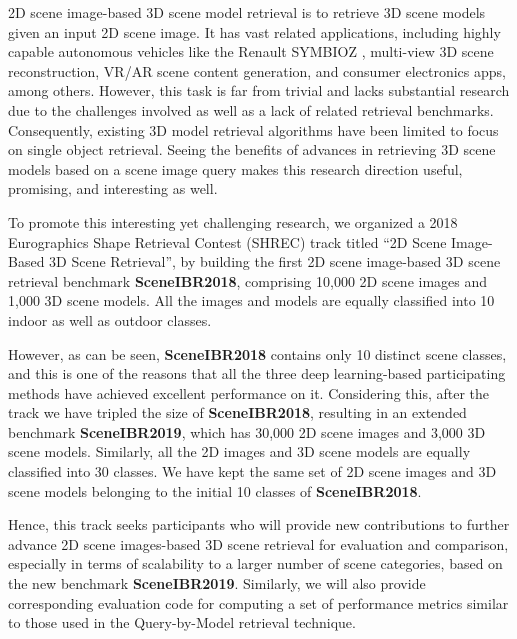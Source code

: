 \documentclass[../main.tex]{subfiles}
\begin{document}
2D scene image-based 3D scene model retrieval is to retrieve 3D scene models given an input 2D scene image. It has vast related applications, including highly capable autonomous vehicles like the Renault SYMBIOZ \cite{Renault} \cite{Youtube}, multi-view 3D scene reconstruction, VR/AR scene content generation, and consumer electronics apps, among others. However, this task is far from trivial and lacks substantial research due to the challenges involved as well as a lack of related retrieval benchmarks. Consequently, existing 3D model retrieval algorithms have been limited to focus on single object retrieval. Seeing the benefits of advances in retrieving 3D scene models based on a scene image query makes this research direction useful, promising, and interesting as well.

To promote this interesting yet challenging research, we organized a 2018 Eurographics Shape Retrieval Contest (SHREC) track \cite{SHREC18-SceneIBR-Track} titled “2D Scene Image-Based 3D Scene Retrieval”, by building the first 2D scene image-based 3D scene retrieval benchmark \textbf{SceneIBR2018}, comprising 10,000 2D scene images and 1,000 3D scene models. All the images and models are equally classified into 10 indoor as well as outdoor classes.

However, as can be seen, \textbf{SceneIBR2018} contains only 10 distinct scene classes, and this is one of the reasons that all the three deep learning-based participating methods have achieved excellent performance on it. Considering this, after the track we have tripled the size of \textbf{SceneIBR2018}, resulting in an extended benchmark \textbf{SceneIBR2019}, which has 30,000 2D scene images and 3,000 3D scene models. Similarly, all the 2D images and 3D scene models are equally classified into 30 classes. We have kept the same set of 2D scene images and 3D scene models belonging to the initial 10 classes of \textbf{SceneIBR2018}.

Hence, this track seeks participants who will provide new contributions to further advance 2D scene images-based 3D scene retrieval for evaluation and comparison, especially in terms of scalability to a larger number of scene categories, based on the new benchmark \textbf{SceneIBR2019}. Similarly, we will also provide corresponding evaluation code for computing a set of performance metrics similar to those used in the Query-by-Model retrieval technique.
\end{document}
